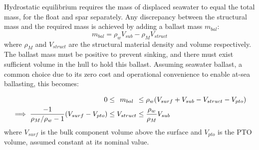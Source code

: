 Hydrostatic equilibrium requires the mass of displaced seawater to equal the total mass, for the float and spar separately.
Any discrepancy between the structural mass and the required mass is achieved by adding a ballast mass $m_{bal}$:
\begin{equation}
    m_{bal} = \rho_w V_{sub} - \rho_M V_{struct}
\end{equation}
where $\rho_M$ and $V_{struct}$ are the structural material density and volume respectively.
The ballast mass must be positive to prevent sinking, and there must exist sufficient volume in the hull to hold this ballast.
Assuming seawater ballast, a common choice due to its zero cost and operational convenience to enable at-sea ballasting, this becomes:

\begin{equation}\label{eq:vol-constraint}
\begin{aligned}0 &\le{}\\ \implies \frac{-1}{\rho_M/\rho_w - 1}(V_{surf}-V_{pto}) &\le{} \end{aligned}\!
\begin{gathered} m_{bal}\\ \phant V_{struct} \end{gathered}\!
\begin{aligned}{}&\le{}\rho_w (V_{surf}+V_{sub}-V_{struct}-V_{pto})\\ &\le {}\phant \frac{\rho_w}{\rho_M} V_{sub} \end{aligned}
\end{equation}
where $V_{surf}$ is the bulk component volume above the surface and $V_{pto}$ is the PTO volume, assumed constant at its nominal value. %

